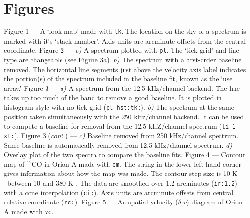 \section{Figures}
\label{sec-fig}
\vspace*{\fill}
\fig Figure 1 --- A `look map' made with {\tt lk}. The location
                 on the sky of a spectrum is marked with it's `stack number'. 
                 Axis units are arcminute offsets from the central coordinate.
\newpage
\vspace*{\fill}
\fig Figure 2 --- {\it a)\/} A spectrum plotted with {\tt pl}. The `tick grid'
         and line type are changeable (see \eg Figure 3a). {\it b)\/} The spectrum
         with a first-order baseline removed. The horizontal line segments
         just above the velocity axis label indicates the portion(s) of the 
         spectrum included in the baseline fit, known as the `use array.'
\newpage
\vspace*{\fill}
\fig Figure 3 --- {\it a)\/} A spectrum from the 12.5 kHz/channel backend. The line
                 takes up too much of the band to remove a good baseline. It is
		 plotted in histogram style with no tick grid ({\tt pl hst:tk:}).
                 {\it b)\/} The spectrum at the same position taken simultaneously 
                 with the 250 kHz/channel backend. It can be used to compute a 
                 baseline for removal from the 12.5 kHZ/channel spectrum 
                 ({\tt li 1 xt:}). 
\newpage
\vspace*{\fill}
\fig Figure 3 ({\it cont.\/}) --- {\it c)\/} Baseline removed from 250 kHz/channel 
                 spectrum. Same baseline is automatically removed from 
                 12.5 kHz/channel spectrum.
		 {\it d)\/} Overlay plot of the two spectra to compare the 
                 baseline fits.
\newpage
\vspace*{\fill}
\fig Figure 4 --- Contour map of $^{12}$CO in Orion A made with {\tt cm}. The 
        string in the lower left hand corner gives information about how the
        map was made. The contour step size is 10 K \kms\ between 10 and 380 K \kms.
        The data are smoothed over 1.2 arcminutes ({\tt ir:1.2}) with a cone 
        interpolation ({\tt ci:}). Axis units are arcminute offsets from 
        central relative coordinate ({\tt rc:}).
\newpage
\vspace*{\fill}
\fig Figure 5 --- An spatial-velocity ($\delta$-$v$) diagram of Orion A made 
                  with {\tt vc}.
\newpage
